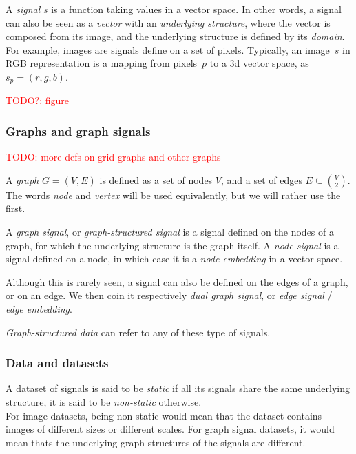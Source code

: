 \documentclass{article}
\theoremstyle{definition}
\begin{document}
A \emph{signal} $s$ is a function taking values in a vector space. In other words, a signal can also be seen as a \emph{vector} with an \emph{underlying structure}, where the vector is composed from its image, and the underlying structure is defined by its \emph{domain}.\\

For example, images are signals define on a set of pixels. Typically, an image~$s$ in RGB representation is a mapping from pixels~$p$ to a 3d vector space, as $s_p = (r,g,b)$.

\textcolor{red}{TODO?: figure}
\begin{figure}

\end{figure}

\subsubsection{Graphs and graph signals}

%
\textcolor{red}{TODO: more defs on grid graphs and other graphs}
%

A \emph{graph} $G = (V, E)$ is defined as a set of nodes $V$, and a set of edges $E \subseteq\binom{V}{2}$. The words \emph{node} and \emph{vertex} will be used equivalently, but we will rather use the first.

A \emph{graph signal}, or \emph{graph-structured signal} is a signal defined on the nodes of a graph, for which the underlying structure is the graph itself.
A \emph{node signal} is a signal defined on a node, in which case it is a \emph{node embedding} in a vector space.

Although this is rarely seen, a signal can also be defined on the edges of a graph, or on an edge. We then coin it respectively \emph{dual graph signal}, or \emph{edge signal} / \emph{edge embedding}.

\emph{Graph-structured data} can refer to any of these type of signals.

\subsubsection{Data and datasets}

A dataset of signals is said to be \emph{static} if all its signals share the same underlying structure, it is said to be \emph{non-static} otherwise.\\
For image datasets, being non-static would mean that the dataset contains images of different sizes or different scales. For graph signal datasets, it would mean thats the underlying graph structures of the signals are different.
\end{document}

